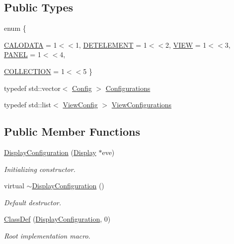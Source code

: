 \subsection*{Public Types}
\begin{DoxyCompactItemize}
\item 
enum \{ \par
\hyperlink{class_d_d4hep_1_1_display_configuration_a737e6239be43c43453ad6e198ea3e643abcbd85a37c2a19250e645e4713802406}{CALODATA} = 1$<$$<$1, 
\hyperlink{class_d_d4hep_1_1_display_configuration_a737e6239be43c43453ad6e198ea3e643acd086f2d94e5029833704a4632bd110a}{DETELEMENT} = 1$<$$<$2, 
\hyperlink{class_d_d4hep_1_1_display_configuration_a737e6239be43c43453ad6e198ea3e643aa8e34c6d660c07116cde351d42dad9af}{VIEW} = 1$<$$<$3, 
\hyperlink{class_d_d4hep_1_1_display_configuration_a737e6239be43c43453ad6e198ea3e643a8d2ce55c420635bef4b36e3f89340419}{PANEL} = 1$<$$<$4, 
\par
\hyperlink{class_d_d4hep_1_1_display_configuration_a737e6239be43c43453ad6e198ea3e643a19f7e2413bc4870fc2c50ad516fb1f5d}{COLLECTION} = 1$<$$<$5
 \}
\item 
typedef std::vector$<$ \hyperlink{class_d_d4hep_1_1_display_configuration_1_1_config}{Config} $>$ \hyperlink{class_d_d4hep_1_1_display_configuration_ac43586ae2c70f106cc9027d452d383d7}{Configurations}
\item 
typedef std::list$<$ \hyperlink{class_d_d4hep_1_1_display_configuration_1_1_view_config}{ViewConfig} $>$ \hyperlink{class_d_d4hep_1_1_display_configuration_a38d6c82b57ac859a5d5cf67fe26f4920}{ViewConfigurations}
\end{DoxyCompactItemize}
\subsection*{Public Member Functions}
\begin{DoxyCompactItemize}
\item 
\hyperlink{class_d_d4hep_1_1_display_configuration_aa27fd31b55d167964c8d5e6d66c8a597}{DisplayConfiguration} (\hyperlink{class_d_d4hep_1_1_display}{Display} $\ast$eve)
\begin{DoxyCompactList}\small\item\em Initializing constructor. \item\end{DoxyCompactList}\item 
virtual \hyperlink{class_d_d4hep_1_1_display_configuration_a2271117a8a383c48f4f90728974e2b6d}{$\sim$DisplayConfiguration} ()
\begin{DoxyCompactList}\small\item\em Default destructor. \item\end{DoxyCompactList}\item 
\hyperlink{class_d_d4hep_1_1_display_configuration_a93b904a9305d5666bef3094fb5db6551}{ClassDef} (\hyperlink{class_d_d4hep_1_1_display_configuration}{DisplayConfiguration}, 0)
\begin{DoxyCompactList}\small\item\em Root implementation macro. \item\end{DoxyCompactList}\end{DoxyCompactItemize}
